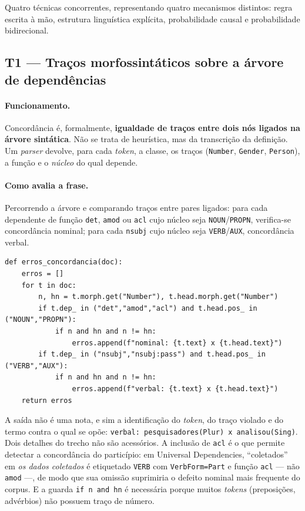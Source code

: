 \documentclass[11pt,a4paper]{article}
\begin{document}
Quatro técnicas concorrentes, representando quatro mecanismos distintos: regra escrita à mão,
estrutura linguística explícita, probabilidade causal e probabilidade bidirecional.

\subsection{T1 --- Traços morfossintáticos sobre a árvore de dependências}

\paragraph{Funcionamento.} Concordância é, formalmente, \textbf{igualdade de traços entre dois nós
ligados na árvore sintática}. Não se trata de heurística, mas da transcrição da definição. Um
\textit{parser} devolve, para cada \textit{token}, a classe, os traços (\texttt{Number},
\texttt{Gender}, \texttt{Person}), a função e o \emph{núcleo} do qual depende.

\paragraph{Como avalia a frase.} Percorrendo a árvore e comparando traços entre pares ligados: para
cada dependente de função \texttt{det}, \texttt{amod} ou \texttt{acl} cujo núcleo seja
\texttt{NOUN}/\texttt{PROPN}, verifica-se concordância nominal; para cada \texttt{nsubj} cujo núcleo
seja \texttt{VERB}/\texttt{AUX}, concordância verbal.

\begin{lstlisting}
def erros_concordancia(doc):
    erros = []
    for t in doc:
        n, hn = t.morph.get("Number"), t.head.morph.get("Number")
        if t.dep_ in ("det","amod","acl") and t.head.pos_ in ("NOUN","PROPN"):
            if n and hn and n != hn:
                erros.append(f"nominal: {t.text} x {t.head.text}")
        if t.dep_ in ("nsubj","nsubj:pass") and t.head.pos_ in ("VERB","AUX"):
            if n and hn and n != hn:
                erros.append(f"verbal: {t.text} x {t.head.text}")
    return erros
\end{lstlisting}

\noindent A saída não é uma nota, e sim a identificação do \textit{token}, do traço violado e do
termo contra o qual se opõe: \texttt{verbal: pesquisadores(Plur) x analisou(Sing)}. Dois detalhes do
trecho não são acessórios. A inclusão de \texttt{acl} é o que permite detectar a concordância do
particípio: em Universal Dependencies, ``coletados'' em \emph{os dados coletados} é etiquetado
\texttt{VERB} com \texttt{VerbForm=Part} e função \texttt{acl} --- não \texttt{amod} ---, de modo que
sua omissão suprimiria o defeito nominal mais frequente do corpus. E a guarda \texttt{if n and hn}
é necessária porque muitos \textit{tokens} (preposições, advérbios) não possuem traço de número.
\end{document}
